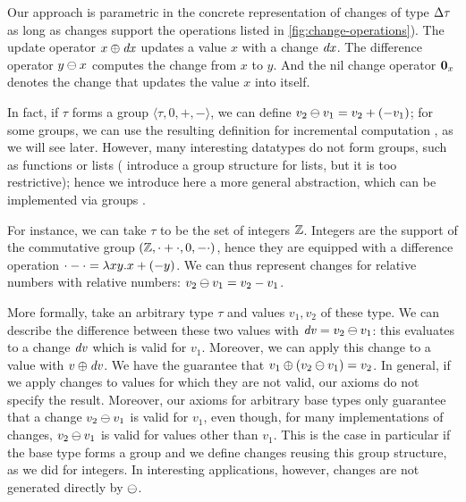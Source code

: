 \begin{oldSec}
Our approach is parametric in the concrete representation of
changes of type $\Change{\tau}$ as long as changes support the
operations listed in \cref{fig:change-operations}).
The update operator $\Apply{\D x}{x}$ updates a value $x$ with a
change $\mathit{dx}$. The difference operator $\Diff{y}{x}$ computes the
change from $x$ to $y$.
And the nil change operator $\Nil{x}$
denotes the change that updates the value $x$ into itself.

In fact, if $\tau$ forms a group $\langle \tau, 0, +, -\rangle$,
we can define $\Diff{v_2}{v_1} = v_2 + (- v_1)$; for some groups,
we can use the resulting definition for incremental computation
, as we will see later.
However, many interesting datatypes do not form groups, such as
functions or lists (\citet{GlucheGrust97Incr} introduce a group
structure for lists, but it is too restrictive);
hence we introduce here a more general abstraction, which can be
implemented via groups .

For instance, we can take $\tau$ to be the set of integers $\mathbb Z$. Integers are
the support of the commutative group $(\mathbb Z, \cdot + \cdot, 0, -\cdot)$, hence they are equipped
with a difference operation $\cdot-\cdot = \lambda x y. x + (-y)$. We can thus represent
changes for relative numbers with relative numbers: $\Diff{v_2}{v_1} = v_2 -
v_1$.

More formally, take an arbitrary type $\tau$ and values $v_1, v_2$ of
these type. We can describe the difference between these two values
with $\D v = \Diff{v_2}{v_1}$: this evaluates to a change $\mathit{dv}$ which is
valid for $v_1$. Moreover, we can apply  this change to a value
with $\Apply{\D v}v$. We have the guarantee that
$\Apply{\left(\Diff{v_2}{v_1}\right)}{v_1} = v_2$. In general, if we
apply changes to values for which they are not valid, our axioms do
not specify the result. Moreover, our axioms for arbitrary base types
only guarantee that a change $\Diff{v_2}{v_1}$ is valid for $v_1$,
even though, for many implementations of changes, $\Diff{v_2}{v_1}$ is
valid for values other than $v_1$. This is the case in particular if
the base type forms a group and we define changes reusing this group
structure, as we did for integers. In interesting applications, however, changes
are not generated directly by $\DIFF$.


\end{oldSec}
